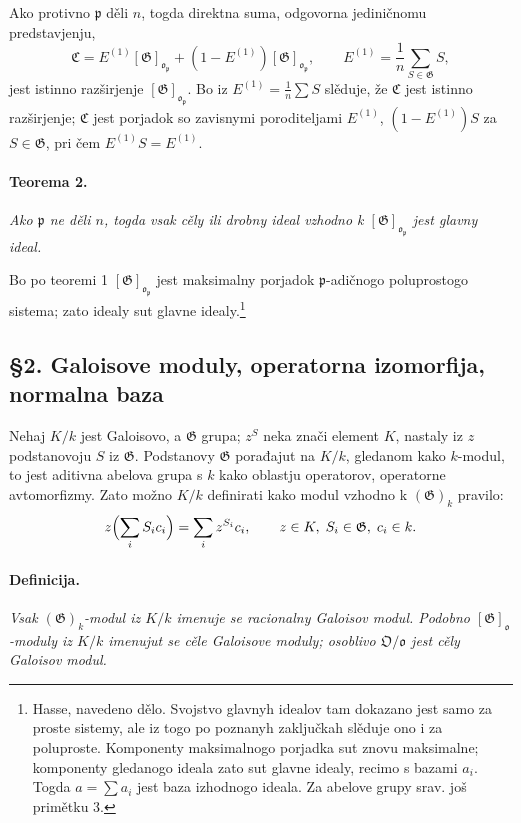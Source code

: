 \documentclass[11pt]{article}
\providecommand{\frakO}{\mathfrak{O}}
\providecommand{\frako}{\mathfrak{o}}
\providecommand{\frakp}{\mathfrak{p}}
\providecommand{\Gg}{\mathfrak{G}}
\begin{document}
Ako protivno \(\frakp\) děli \(n\), togda direktna suma, odgovorna jediničnomu predstavjenju,
\[
        \mathfrak C=E^{(1)}[\Gg]_{\frako_\frakp}+(1-E^{(1)})[\Gg]_{\frako_\frakp},
        \qquad
        E^{(1)}=\frac1n\sum_{S\in\Gg} S,
\]
jest istinno razširjenje \([\Gg]_{\frako_\frakp}\). Bo iz \(E^{(1)}=\frac1n\sum S\) slěduje, že \(\mathfrak C\) jest istinno razširjenje; \(\mathfrak C\) jest porjadok so zavisnymi poroditeljami \(E^{(1)}\), \((1-E^{(1)})S\) za \(S\in\Gg\), pri čem \(E^{(1)}S=E^{(1)}\).

\paragraph{Teorema 2.}
\emph{Ako \(\frakp\) ne děli \(n\), togda vsak cěly ili drobny ideal vzhodno k \([\Gg]_{\frako_\frakp}\) jest glavny ideal.}

Bo po teoremi 1 \([\Gg]_{\frako_\frakp}\) jest maksimalny porjadok \(\frakp\)-adičnogo poluprostogo sistema; zato idealy sut glavne idealy.\footnote{Hasse, navedeno dělo. Svojstvo glavnyh idealov tam dokazano jest samo za proste sistemy, ale iz togo po poznanyh zaključkah slěduje ono i za poluproste. Komponenty maksimalnogo porjadka sut znovu maksimalne; komponenty gledanogo ideala zato sut glavne idealy, recimo s bazami \(a_i\). Togda \(a=\sum a_i\) jest baza izhodnogo ideala. Za abelove grupy srav. još primětku 3.}

\subsection*{§2. Galoisove moduly, operatorna izomorfija, normalna baza}

Nehaj \(K/k\) jest Galoisovo, a \(\Gg\) grupa; \(z^S\) neka znači element \(K\), nastaly iz \(z\) podstanovoju \(S\) iz \(\Gg\). Podstanovy \(\Gg\) porađajut na \(K/k\), gledanom kako \(k\)-modul, to jest aditivna abelova grupa s \(k\) kako oblastju operatorov, operatorne avtomorfizmy. Zato možno \(K/k\) definirati kako modul vzhodno k \((\Gg)_k\) pravilo:
\[
        z\Bigl(\sum_i S_i c_i\Bigr)=\sum_i z^{S_i}c_i,
        \qquad z\in K,\; S_i\in\Gg,\; c_i\in k.
\]

\paragraph{Definicija.}
\emph{Vsak \((\Gg)_k\)-modul iz \(K/k\) imenuje se racionalny Galoisov modul. Podobno \([\Gg]_\frako\)-moduly iz \(K/k\) imenujut se cěle Galoisove moduly; osoblivo \(\frakO/\frako\) jest cěly Galoisov modul.}
\end{document}
